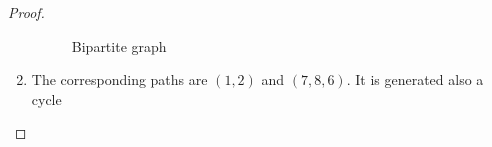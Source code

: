 \begin{proof}
\begin{enumerate}[label=(\roman*)]
\begin{figure}[H]
\begin{center}
                \end{center}                            
                \caption{Bipartite graph}
                \label{t2:p12_BipartiteGraph_Matching.png}                        
            \end{figure}\pn 
         \item
            The corresponding paths are $(1, 2)$ and $(7, 8, 6)$. It is generated also a cycle
    \end{enumerate}
\end{proof}
